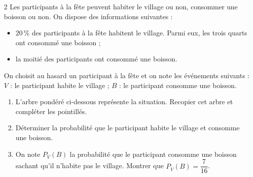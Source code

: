 \documentclass[a4paper,10pt]{article}
\renewenvironment{center}{\par\addvspace{3pt}\centering}{\par\addvspace{3pt}}
\begin{document}
\begin{multicols}{2}
Les participants à la fête peuvent habiter le village ou non, consommer une boisson ou
non. On dispose des informations suivantes :
\begin{itemize}
  \item $20\,\%$ des participants à la fête habitent le village. Parmi eux, les trois
        quarts ont consommé une boisson ;
  \item la moitié des participants ont consommé une boisson.
\end{itemize}
On choisit au hasard un participant à la fête et on note les événements suivants :
$V$ : \og le participant habite le village\fg{} ; $B$ : \og le participant consomme
une boisson\fg.
\begin{enumerate}
  \item L'arbre pondéré ci-dessous représente la situation. Recopier cet arbre et
        compléter les pointillés.
        \begin{center}
        \end{center}
  \item Déterminer la probabilité que le participant habite le village et consomme une
        boisson.
  \item On note $P_{\overline{V}}(B)$ la probabilité que le participant consomme une
        boisson sachant qu'il n'habite pas le village. Montrer que
        $P_{\overline{V}}(B)=\dfrac{7}{16}$.
\end{enumerate}


\end{multicols}
\end{document}
